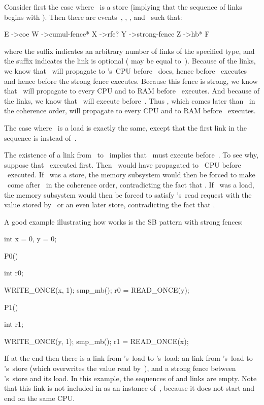 Consider first the case where ~is a store (implying that the sequence
of links begins with ).
Then there are events~, , , and~ such that:

\begin{VerbatimU}
	E ->coe W ->cumul-fence* X ->rfe? Y ->strong-fence Z ->hb* F
\end{VerbatimU}

\noindent%
where the \qco{*} suffix indicates an arbitrary number of links of the
specified type, and the  suffix indicates the link is optional
( may be equal to~).
Because of the  links, we know that ~will
propagate to 's~CPU before ~does, hence before
~executes and hence before the strong fence executes.
Because this fence is strong, we know that ~will propagate to
every CPU and to RAM before ~executes.
And because of the  links, we know that ~will execute
before~.
Thus , which comes later than~ in the coherence order, will
propagate to every CPU and to RAM before ~executes.

The case where ~is a load is exactly the same, except that the first
link in the sequence is  instead of~.

The existence of a  link from~ to~ implies that
~must execute before~.
To see why, suppose that ~executed first.
Then ~would have propagated to ~CPU before ~executed.
If ~was a store, the memory subsystem would then be forced to
make ~come after~ in the coherence order, contradicting
the fact that .
If ~was a load, the memory subsystem would then be forced to
satisfy 's~read request with the value stored by~ or an
even later store, contradicting the fact that .

A good example illustrating how  works is the SB pattern with strong
fences:

\begin{VerbatimU}
	int x = 0, y = 0;

	P0()
	{
		int r0;

		WRITE_ONCE(x, 1);
		smp_mb();
		r0 = READ_ONCE(y);
	}

	P1()
	{
		int r1;

		WRITE_ONCE(y, 1);
		smp_mb();
		r1 = READ_ONCE(x);
	}
\end{VerbatimU}

If  at the end then there is a  link from 's~load
to 's~load{:} an  link from 's~load to 's~store
(which overwrites the value read by~), and a strong fence
between 's~store and its load.
In this example, the sequences of  and  links are empty.
Note that this  link is not included in  as an instance
of~, because it does not start and end on the same CPU\@.

